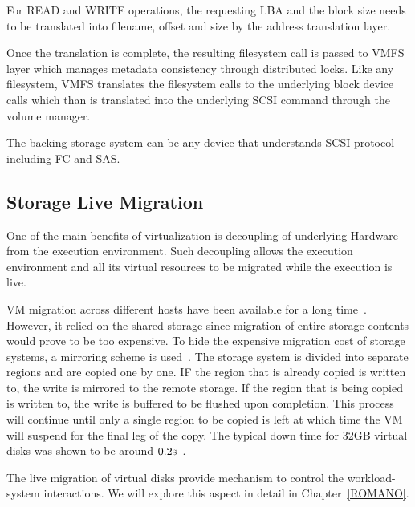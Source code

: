 For READ and WRITE operations, the requesting LBA and the block size needs to be translated into filename, offset and size by the address translation layer. 

Once the translation is complete, the resulting filesystem call is passed to VMFS layer which manages metadata consistency through distributed locks. 
Like any filesystem, VMFS translates the filesystem calls to the underlying block device calls which than is translated into the underlying SCSI command through the volume manager. 

The backing storage system can be any device that understands SCSI protocol including FC and SAS. 


\subsection{Storage Live Migration}
One of the main benefits of virtualization is decoupling of underlying Hardware from the execution environment. 
Such decoupling allows the execution environment and all its virtual resources to be migrated while the execution is live. 

VM migration across different hosts have been available for a long time~\cite{clark:2005}.
However, it relied on the shared storage since migration of entire storage contents would prove to be too expensive.
To hide the expensive migration cost of storage systems, a mirroring scheme is used~\cite{mashtizadeh:2011}.
The storage system is divided into separate regions and are copied one by one. IF the region that is already copied is written to, the write is mirrored to the remote storage. 
If the region that is being copied is written to, the write is buffered to be flushed upon completion. 
This process will continue until only a single region to be copied is left at which time the VM will suspend for the final leg of the copy. 
The typical down time for 32GB virtual disks was shown to be around $0.2{\mathrm{s}}$~\cite{mashtizadeh:2011}.

The live migration of virtual disks provide mechanism to control the workload-system interactions.
We will explore this aspect in detail in Chapter~\ref{ROMANO}.

